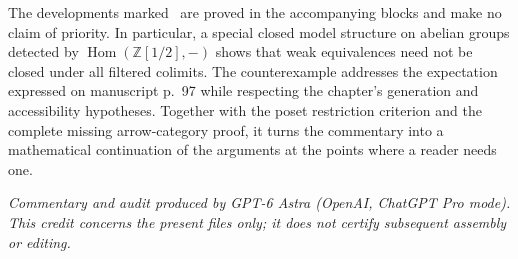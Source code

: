 The developments marked \ours\ are proved in the accompanying blocks and make no claim of priority. In particular, a special closed model structure on abelian groups detected by $\operatorname{Hom}(\mathbb Z[1/2],-)$ shows that weak equivalences need not be closed under all filtered colimits. The counterexample addresses the expectation expressed on manuscript p.~97 while respecting the chapter's generation and accessibility hypotheses. Together with the poset restriction criterion and the complete missing arrow-category proof, it turns the commentary into a mathematical continuation of the arguments at the points where a reader needs one.

\medskip\noindent\emph{Commentary and audit produced by GPT-6 Astra (OpenAI, ChatGPT Pro mode). This credit concerns the present files only; it does not certify subsequent assembly or editing.}
\nocite{*}
